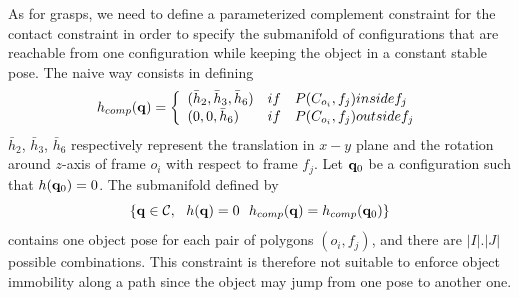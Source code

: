 As for grasps, we need to define a parameterized complement constraint for the contact constraint in order to specify the submanifold of configurations that are reachable from one configuration while keeping the object in a constant stable pose. The naive way consists in defining
$$
h_{comp}(\mathbf{q}) = \left\{\begin{array}{lll}(\bar{h}_2,\bar{h}_3,\bar{h}_6)&
\relax{if} & P(C_{o_i},f_j)\relax{ inside } f_j\\
(0,0,\bar{h}_6)&
\relax{if} & P(C_{o_i},f_j)\relax{ outside } f_j\end{array}\right.
$$
$\bar{h}_2$, $\bar{h}_3$, $\bar{h}_6$ respectively represent the translation in $x-y$ plane and the rotation around $z$-axis of frame $o_i$ with respect to frame $f_j$. Let $\mathbf{q}_0$ be a configuration such that $h(\mathbf{q}_0)=0$. The submanifold defined by
\begin{equation}\label{eq:stable-pose}
\left\{\conf\in\CS,\ \ h(\conf)=0\ \ h_{comp}(\conf) = h_{comp}(\conf_0) \right\}
\end{equation}
contains one object pose for each pair of polygons $(o_i,f_j)$, and there are
$|I| . |J|$ possible combinations. This constraint is therefore not suitable to
enforce object immobility along a path since the object may jump from one pose to another one.

